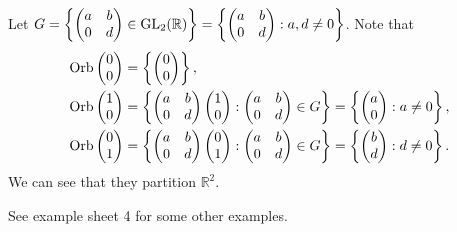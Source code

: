\documentclass[a4paper]{article}
\begin{document}
\begin{example}
  Let $ G = \left\{
    \begin{pmatrix} a&b\\0&d
  \end{pmatrix}\in \mathrm{GL}_2(\mathbb{R}) \right\}=\left\{
    \begin{pmatrix} a&b\\0&d
  \end{pmatrix}:a,d\neq 0 \right\} $. Note that
  \begin{align*}
    \operatorname{Orb}
    \begin{pmatrix}
      0\\0
    \end{pmatrix}&=\left\{
      \begin{pmatrix}
        0\\0
    \end{pmatrix} \right\},\\
    \operatorname{Orb}
    \begin{pmatrix}
      1\\0
    \end{pmatrix}&=\left\{
      \begin{pmatrix} a&b\\0&d
      \end{pmatrix}
      \begin{pmatrix}
        1\\0
      \end{pmatrix}:
      \begin{pmatrix} a&b\\0&d
    \end{pmatrix}\in G \right\} = \left\{
      \begin{pmatrix}
        a\\0
    \end{pmatrix}:a\neq 0 \right\},\\
    \operatorname{Orb}
    \begin{pmatrix}
      0\\1
    \end{pmatrix}&=\left\{
      \begin{pmatrix} a&b\\0&d
      \end{pmatrix}
      \begin{pmatrix}
        0\\1
      \end{pmatrix}:
      \begin{pmatrix} a&b\\0&d
    \end{pmatrix}\in G \right\} = \left\{
      \begin{pmatrix}
        b\\d
    \end{pmatrix}:d\neq 0 \right\}.
  \end{align*}
  We can see that they partition $ \mathbb{R}^{2} $.
\end{example}
See example sheet 4 for some other examples.
\end{document}
